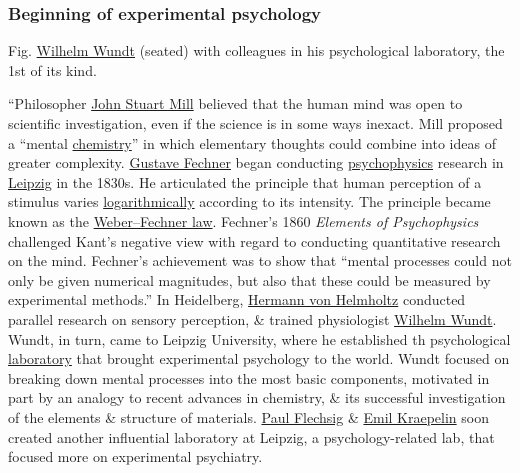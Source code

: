 \documentclass[oneside]{book}
\numberwithin{equation}{section}
\begin{document}
\subsubsection{Beginning of experimental psychology}
\textsf{Fig. \href{https://en.wikipedia.org/wiki/Wilhelm_Wundt}{Wilhelm Wundt} (seated) with colleagues in his psychological laboratory, the 1st of its kind.}

``Philosopher \href{https://en.wikipedia.org/wiki/John_Stuart_Mill}{John Stuart Mill} believed that the human mind was open to scientific investigation, even if the science is in some ways inexact. Mill proposed a ``mental \href{https://en.wikipedia.org/wiki/Chemistry}{chemistry}'' in which elementary thoughts could combine into ideas of greater complexity. \href{https://en.wikipedia.org/wiki/Gustav_Fechner}{Gustave Fechner} began conducting \href{https://en.wikipedia.org/wiki/Psychophysics}{psychophysics} research in \href{https://en.wikipedia.org/wiki/Leipzig}{Leipzig} in the 1830s. He articulated the principle that human perception of a stimulus varies \href{https://en.wikipedia.org/wiki/Logarithmically}{logarithmically} according to its intensity. The principle became known as the \href{https://en.wikipedia.org/wiki/Weber%E2%80%93Fechner_law}{Weber--Fechner law}. Fechner's 1860 \textit{Elements of Psychophysics} challenged Kant's negative view with regard to conducting quantitative research on the mind. Fechner's achievement was to show that ``mental processes could not only be given numerical magnitudes, but also that these could be measured by experimental methods.'' In Heidelberg, \href{https://en.wikipedia.org/wiki/Hermann_von_Helmholtz}{Hermann von Helmholtz} conducted parallel research on sensory perception, \& trained physiologist \href{https://en.wikipedia.org/wiki/Wilhelm_Wundt}{Wilhelm Wundt}. Wundt, in turn, came to Leipzig University, where he established th psychological \href{https://en.wikipedia.org/wiki/Laboratory}{laboratory} that brought experimental psychology to the world. Wundt focused on breaking down mental processes into the most basic components, motivated in part by an analogy to recent advances in chemistry, \& its successful investigation of the elements \& structure of materials. \href{https://en.wikipedia.org/wiki/Paul_Flechsig}{Paul Flechsig} \& \href{https://en.wikipedia.org/wiki/Emil_Kraepelin}{Emil Kraepelin} soon created another influential laboratory at Leipzig, a psychology-related lab, that focused more on experimental psychiatry.
\end{document}
